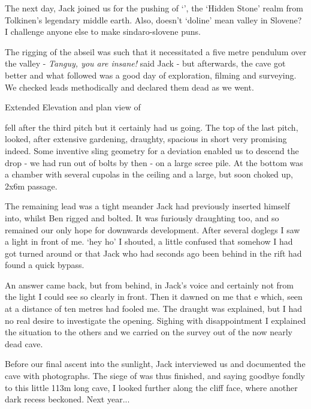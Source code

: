 The next day, Jack joined us for the pushing of `', the `Hidden Stone' realm from Tolkinen's legendary middle earth. Also, doesn't `doline' mean valley in Slovene? I challenge anyone else to make sindaro-slovene puns. 

The rigging of the abseil was such that it necessitated a five metre pendulum over the  valley - \textit{Tanguy, you are insane!} said Jack - but afterwards, the cave got better and what followed was a good day of exploration, filming and surveying. We checked leads methodically and declared them dead as we went. 

\begin{pagesurvey}
    \centering
    \caption[Gondolin plan and elevation]{Extended Elevation and plan view of \protect{}}
    \label{}
\end{pagesurvey}

 fell after the third pitch but it certainly had us going. The top of the last pitch, looked, after extensive gardening, draughty, spacious in short very promising indeed. Some inventive sling geometry for a deviation enabled us to descend the drop - we had run out of bolts by then -  on a large scree pile.  At the bottom was a chamber with several cupolas in the ceiling and a large, but soon choked up, 2x6m passage. 

The remaining lead was a tight meander Jack had previously inserted himself into, whilst Ben rigged and bolted. It was furiously draughting too, and so remained our only hope for downwards development. After several doglegs I saw a light in front of me. `hey ho' I shouted, a little confused that somehow I had got turned around or that Jack who had seconds ago been behind in the rift had found a quick bypass. 

An answer came back, but from behind, in Jack's voice and certainly not from the light I could see so clearly in front. Then it dawned on me that e which, seen at a distance of ten metres had fooled me. The draught was explained, but I had no real desire to investigate the opening. Sighing with disappointment I explained the situation to the others and we carried on the survey out of the now nearly dead cave. 

Before our final ascent into the sunlight, Jack interviewed us and documented the cave with photographs. The siege of  was thus finished, and saying goodbye fondly to this little 113m long cave, I looked further along the cliff face, where another dark recess beckoned. Next year...

